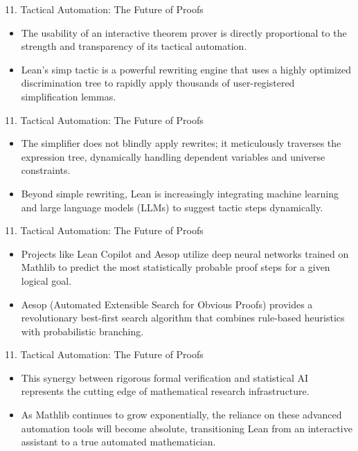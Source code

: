 \documentclass[10pt]{beamer}
\begin{document}
\begin{frame}{11. Tactical Automation: The Future of Proofs}
\begin{itemize}\setlength{\itemsep}{1.5em}
  \item The usability of an interactive theorem prover is directly proportional to the strength and transparency of its tactical automation.
  \item Lean's simp tactic is a powerful rewriting engine that uses a highly optimized discrimination tree to rapidly apply thousands of user-registered simplification lemmas.
\end{itemize}
\end{frame}

\begin{frame}{11. Tactical Automation: The Future of Proofs}
\begin{itemize}\setlength{\itemsep}{1.5em}
  \item The simplifier does not blindly apply rewrites; it meticulously traverses the expression tree, dynamically handling dependent variables and universe constraints.
  \item Beyond simple rewriting, Lean is increasingly integrating machine learning and large language models (LLMs) to suggest tactic steps dynamically.
\end{itemize}
\end{frame}

\begin{frame}{11. Tactical Automation: The Future of Proofs}
\begin{itemize}\setlength{\itemsep}{1.5em}
  \item Projects like Lean Copilot and Aesop utilize deep neural networks trained on Mathlib to predict the most statistically probable proof steps for a given logical goal.
  \item Aesop (Automated Extensible Search for Obvious Proofs) provides a revolutionary best-first search algorithm that combines rule-based heuristics with probabilistic branching.
\end{itemize}
\end{frame}

\begin{frame}{11. Tactical Automation: The Future of Proofs}
\begin{itemize}\setlength{\itemsep}{1.5em}
  \item This synergy between rigorous formal verification and statistical AI represents the cutting edge of mathematical research infrastructure.
  \item As Mathlib continues to grow exponentially, the reliance on these advanced automation tools will become absolute, transitioning Lean from an interactive assistant to a true automated mathematician.
\end{itemize}
\end{frame}
\end{document}

